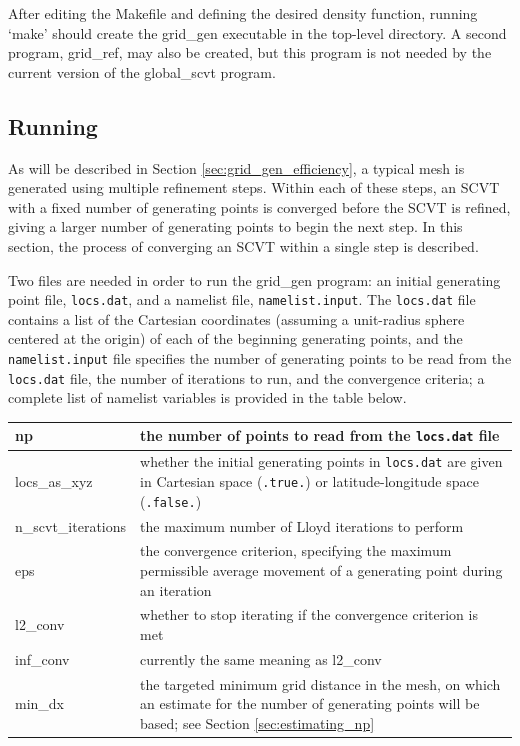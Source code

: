 \documentclass[11pt]{report}
\begin{document}
After editing the Makefile and defining the desired density function, running `make' should create the grid\_gen executable 
in the top-level directory. A second program, grid\_ref, may also be created, but this program is not needed by the current version 
of the global\_scvt program.

\subsection{Running}

As will be described in Section \ref{sec:grid_gen_efficiency}, a typical mesh is generated using multiple refinement steps. Within each of these steps, an SCVT with a fixed
number of generating points is converged before the SCVT is refined, giving a larger number of generating points to begin the next step. In this section, the process of converging an SCVT within a single step is described.

Two files are needed in order to run the grid\_gen program: an initial generating point file, {\tt locs.dat}, and a                        
namelist file, {\tt namelist.input}. The {\tt locs.dat} file contains a list of the Cartesian coordinates (assuming a unit-radius sphere
centered at the origin) of each of the beginning generating points, and the {\tt namelist.input} file specifies the number of generating points to be read from the {\tt locs.dat} file, the number of iterations to run, and the convergence criteria; a complete list of namelist variables is provided in the table below.

\vspace{12pt}
\begin{longtable}{|p{1.25in} |p{4.5in}|}
\hline
np & the number of points to read from the {\tt locs.dat} file \\ \hline
locs\_as\_xyz & whether the initial generating points in {\tt locs.dat} are given in Cartesian space ({\tt .true.}) or latitude-longitude space ({\tt .false.}) \\ \hline
n\_scvt\_iterations & the maximum number of Lloyd iterations to perform \\ \hline
eps & the convergence criterion, specifying the maximum permissible average movement of a generating point during an iteration \\ \hline
l2\_conv & whether to stop iterating if the convergence criterion is met \\ \hline
inf\_conv & currently the same meaning as l2\_conv \\ \hline
min\_dx & the targeted minimum grid distance in the mesh, on which an estimate for the number of generating points will be based; see Section \ref{sec:estimating_np} \\ \hline
\end{longtable}
\vspace{12pt}
\end{document}
